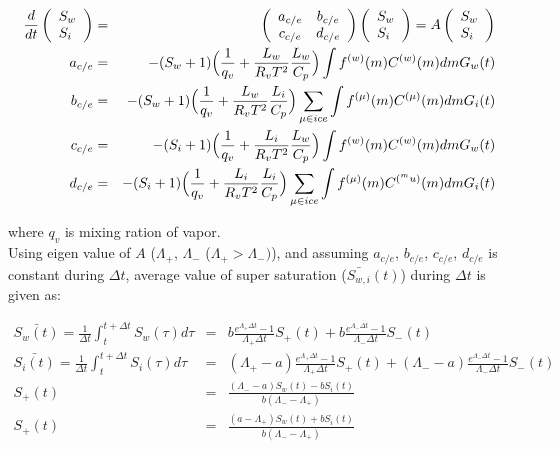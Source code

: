 \begin{eqnarray}
\frac{d}{dt}\left(
\begin{array}{l}
S_{w}\\
S_{i}\\
\end{array}\right )
&=&
\left(
\begin{array}{cc}
a_{c/e}& b_{c/e}\\
c_{c/e}& d_{c/e}
\end{array}\right)
\left(
\begin{array}{l}
S_{w}\\
S_{i}
\end{array}\right)
=
A
\left(
\begin{array}{l}
S_{w}\\
S_{i}
\end{array}\right)\\
a_{c/e}&=&-(S_{w}+1)\Bigl(\frac{1}{q_{v}}+\frac{L_{w}}{R_{v}T^{2}}\frac{L_{w}}{C_{p}}\Bigr )\int f^{(w)}(m)C^{(w)}(m)dm G_{w}(t)\nonumber\\
b_{c/e}&=&-(S_{w}+1)\Bigl(\frac{1}{q_{v}}+\frac{L_{w}}{R_{v}T^{2}}\frac{L_{i}}{C_{p}}\Bigr ) \sum_{\mu \in ice}\int f^{(\mu)}(m)C^{(\mu)}(m)dm G_{i}(t)\nonumber\\
c_{c/e}&=&-(S_{i}+1)\Bigl(\frac{1}{q_{v}}+\frac{L_{i}}{R_{v}T^{2}}\frac{L_{w}}{C_{p}}\Bigr ) \int f^{(w)}(m)C^{(w)}(m)dm G_{w}(t)\nonumber\\
d_{c/e}&=&-(S_{i}+1)\Bigl(\frac{1}{q_{v}}+\frac{L_{i}}{R_{v}T^{2}}\frac{L_{i}}{C_{p}}\Bigr ) \sum_{\mu \in ice}\int f^{(\mu)}(m)C^{(^mu)}(m)dm G_{i}(t)\nonumber
\end{eqnarray}


where $q_{v}$ is mixing ration of vapor. \\
Using eigen value of $A$ ($\Lambda_{+}$, $\Lambda_{-}$ ($\Lambda_{+}>\Lambda_{-})$), and assuming $a_{c/e}$, $b_{c/e}$, $c_{c/e}$, $d_{c/e}$ is constant during $\Delta t$, average value of super saturation ($\bar{S_{w,i}}(t)$) during $\Delta t$ is given as:

\begin{eqnarray}
\bar{S_{w}(t)}=\frac{1}{\Delta t}\int_{t}^{t+\Delta t}S_{w}(\tau)d\tau&=&b\frac{e^{\Lambda_{+}\Delta t}-1}{\Lambda_{+}\Delta t}S_{+}(t)+b\frac{e^{\Lambda_{-}\Delta t}-1}{\Lambda_{-}\Delta t}S_{-}(t)\nonumber\\
\bar{S_{i}(t)}=\frac{1}{\Delta t}\int_{t}^{t+\Delta t}S_{i}(\tau)d\tau&=&(\Lambda_{+}-a)\frac{e^{\Lambda_{+}\Delta t}-1}{\Lambda_{+}\Delta t}S_{+}(t)+(\Lambda_{-}-a)\frac{e^{\Lambda_{-}\Delta t}-1}{\Lambda_{-}\Delta t}S_{-}(t)\nonumber\\
S_{+}(t)&=&\frac{(\Lambda_{-}-a)S_{w}(t)-bS_{i}(t)}{b(\Lambda_{-}-\Lambda_{+})}\nonumber\\
S_{+}(t)&=&\frac{(a-\Lambda_{+})S_{w}(t)+bS_{i}(t)}{b(\Lambda_{-}-\Lambda_{+})}\nonumber
\end{eqnarray}

